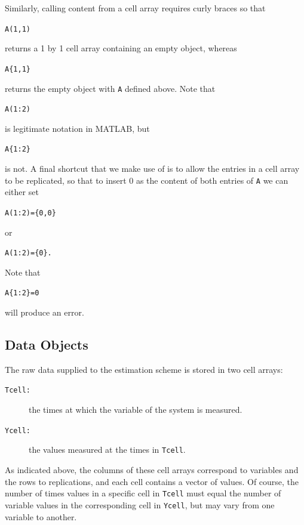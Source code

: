 \documentclass{article}
\newcommand{\nt}    {\noindent}
\begin{document}
\nt Similarly, calling content from a cell array requires curly
braces so that

\begin{alltt}
    A(1,1)
\end{alltt}

\nt returns a 1 by 1 cell array containing an empty object,
whereas

\begin{alltt}
   A\{1,1\}
\end{alltt}

\nt returns the empty object with {\tt A} defined above. Note that

\begin{alltt}
   A(1:2)
\end{alltt}

\nt is legitimate notation in MATLAB, but

\begin{alltt}
   A\{1:2\}
\end{alltt}

\nt is not. A final shortcut that we make use of is to
allow the entries in a cell array to be replicated, so that
to insert 0 as the content of both entries of {\tt A} we
can either set

\begin{alltt}
   A(1:2) = \{0,0\}
\end{alltt}

\nt or

\begin{alltt}
   A(1:2) = \{0\}.
\end{alltt}

\nt Note that

\begin{alltt}
   A\{1:2\} = 0
\end{alltt}

\nt will produce an error.

\subsection{Data Objects}

\nt The raw data supplied to the estimation scheme is stored in two cell arrays:
\begin{description}
\item[\tt Tcell:] the times at which the variable of the system
is measured.
\item[\tt Ycell:] the values measured at the times in {\tt Tcell}.
\end{description}
As indicated above, the columns of these cell arrays correspond to variables and the rows to
replications, and each cell contains a vector of values.  Of course, the number of times values in
a specific cell in \texttt{Tcell} must equal the number of variable values in the corresponding
cell in \texttt{Ycell}, but may vary from one variable to another.
\end{document}
